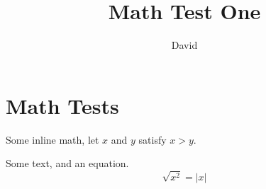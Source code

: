 \documentclass{article}
\begin{document}
\title{Math Test One}
\author{David}
\maketitle

\section{Math Tests}

Some inline math, let $x$ and $y$ satisfy $x>y$.

Some text, and an equation.
\[
\sqrt{x^2}=\lvert x\rvert
\]
\end{document}
